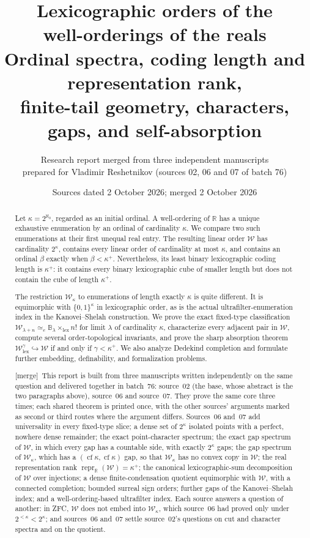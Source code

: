 \documentclass[11pt,a4paper]{article}
\title{\color{Ink}\LARGE Lexicographic orders of the\\well-orderings of the reals\\[7pt]
\large Ordinal spectra, coding length and representation rank,\\finite-tail geometry, characters, gaps, and self-absorption}
\author{Research report merged from three independent manuscripts\\prepared for Vladimir Reshetnikov (sources 02, 06 and 07 of batch 76)}
\date{Sources dated 2 October 2026; merged 2 October 2026}
\theoremstyle{definition}
\theoremstyle{remark}
\newcommand{\R}{\mathbb R}
\newcommand{\W}{\mathcal W}
\newcommand{\B}{\mathbb B}
\newcommand{\two}{\{0,1\}}
\newcommand{\lex}{\mathrm{lex}}
\newcommand{\cf}{\operatorname{cf}}
\newcommand{\emb}{\hookrightarrow}
\newcommand{\equi}{\mathrel{\simeq_{\!e}}}
\newcommand{\repr}{\operatorname{repr}_{\R}}
\newcommand{\merge}{\textsf{[merge]}}
\begin{document}
\maketitle
\begin{abstract}
Let $\kappa=2^{\aleph_0}$, regarded as an initial ordinal. A well-ordering of
$\R$ has a unique exhaustive enumeration by an ordinal of cardinality $\kappa$.
We compare two such enumerations at their first unequal real entry. The
resulting linear order $\W$ has cardinality $2^\kappa$, contains every linear
order of cardinality at most $\kappa$, and contains an ordinal $\beta$ exactly
when $\beta<\kappa^+$. Nevertheless, its least binary lexicographic coding
length is $\kappa^+$: it contains every binary lexicographic cube of smaller
length but does not contain the cube of length $\kappa^+$.

The restriction $\W_\kappa$ to enumerations of length exactly $\kappa$ is
quite different. It is equimorphic with $\two^\kappa$ in lexicographic order,
as is the actual ultrafilter-enumeration index in the Kanovei--Shelah
construction. We prove the exact fixed-type classification
$\W_{\lambda+n}\equi\B_\lambda\times_{\lex}n!$ for limit $\lambda$ of cardinality $\kappa$,
characterize every adjacent
pair in $\W$, compute several order-topological invariants, and prove the
sharp absorption theorem $\W^\gamma_{\lex}\emb\W$ if and only if
$\gamma<\kappa^+$. We also analyze Dedekind completion and formulate further
embedding, definability, and formalization problems.

\merge\ This report is built from three manuscripts written independently on
the same question and delivered together in batch~76: source~02 (the base,
whose abstract is the two paragraphs above), source~06 and source~07. They
prove the same core three times; each shared theorem is printed once, with the
other sources' arguments marked as second or third routes where the argument
differs. Sources~06 and~07 add universality in every fixed-type slice; a dense
set of $2^\kappa$ isolated points with a perfect, nowhere dense remainder; the
exact point-character spectrum; the exact gap spectrum of $\W$, in which every
gap has a countable side, with exactly $2^\kappa$ gaps; the gap spectrum of
$\W_\kappa$, which has a $(\cf\kappa,\cf\kappa)$ gap, so that $\W_\kappa$ has no
convex copy in $\W$; the real representation rank $\repr(\W)=\kappa^+$; the
canonical lexicographic-sum decomposition of $\W$ over injections; a dense
finite-condensation quotient equimorphic with $\W$, with a connected
completion; bounded surreal sign orders; further gaps of the Kanovei--Shelah
index; and a well-ordering-based ultrafilter index. Each source answers a
question of another: in ZFC, $\W$ does not embed into $\W_\kappa$, which
source~06 had proved only under $2^{<\kappa}<2^\kappa$; and sources~06 and~07
settle source~02's questions on cut and character spectra and on the quotient.
\end{abstract}
\end{document}
